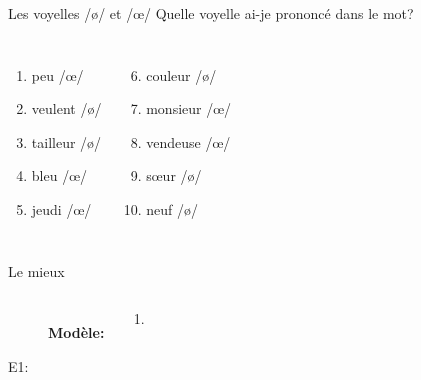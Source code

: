 \documentclass{beamer}
\begin{document}
  \begin{frame}{Les voyelles /ø/ et /œ/}
    Quelle voyelle ai-je prononcé dans le mot?
    \begin{columns}
        \begin{enumerate}
          \item peu  /œ/
          \item veulent /ø/ 
          \item tailleur /ø/ 
          \item bleu  /œ/
          \item jeudi  /œ/
        \end{enumerate}
        \begin{enumerate}
          \setcounter{enumi}{5}
          \item couleur /ø/ 
          \item monsieur  /œ/
          \item vendeuse  /œ/
          \item sœur /ø/ 
          \item neuf /ø/ 
        \end{enumerate}
    \end{columns}
  \end{frame}

  \begin{frame}{Le mieux}
     \\
    \tinygloss{}
    \begin{columns}
        \begin{description}
          \item[] \textbf{Modèle:}
          \item[] \lexi{}
          \item[E1:]
        \end{description}
        \begin{enumerate}
          \item
        \end{enumerate}
    \end{columns}
  \end{frame}
\end{document}
